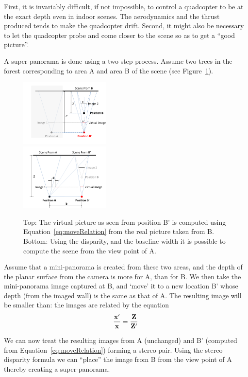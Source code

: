 \documentclass[10pt,twocolumn,letterpaper]{article}
\begin{document}
First, it is invariably difficult, if not impossible, to control a
quadcopter to be at the exact depth even in indoor scenes.  The
aerodynamics and the thrust produced tends to make the quadcopter
drift.  Second, it might also be necessary to let the quadcopter probe
and come closer to the scene so as to get a ``good picture''.

A super-panorama is done using a two step process. Assume two trees in
the forest corresponding to area A and area B of the scene (see
Figure~\ref{fig:stereo}). 
\begin{figure}[h!]
  \centering
  \includegraphics[width=0.4\textwidth]{figures/move} \\
  \includegraphics[width=0.4\textwidth]{figures/stereo} 
  \caption{ \label{fig:stereo} Top: The virtual picture as seen from position B'
    is computed using Equation~\ref{eq:moveRelation} from the real picture
    taken from B.  Bottom: Using the disparity, and the baseline width
  it is possible to compute the scene from the view point of A.}
\end{figure}    
Assume that a mini-panorama is created from these two areas, and the
depth of the planar surface from the camera is more for A, than for
B. We then take the mini-panorama image captured at B, and `move' it to
a new location B’ whose depth (from the imaged wall) is the same as
that of A. The resulting image  will be smaller than: the images are
related by the equation
\begin{equation}
  \label{eq:moveRelation}
  {\bf \frac{x'}{x} = \frac{Z}{Z'}}
\end{equation}

We can now treat the resulting images from A (unchanged) and B’
(computed from Equation~\ref{eq:moveRelation}) forming a stereo pair.
Using the stereo disparity formula we can ``place'' the image from B from the
view point of A thereby creating a super-panorama.
\end{document}
